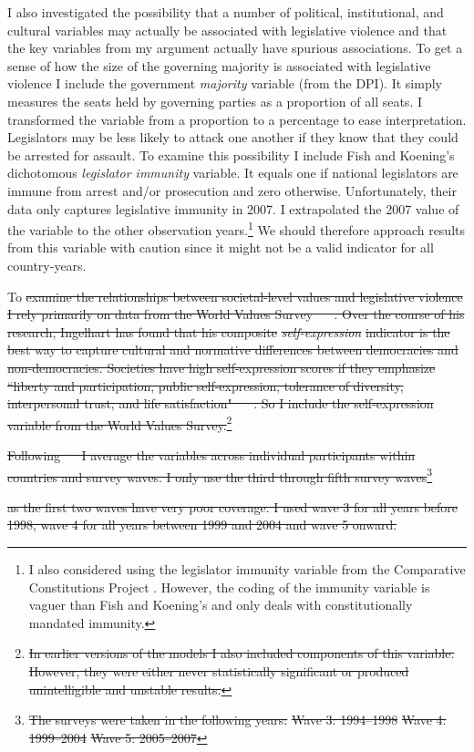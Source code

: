 \documentclass[a4paper]{article}\usepackage[]{graphicx}\usepackage[]{color}
\providecommand{\DIFdeltex}[1]{{\protect\color{red}\sout{#1}}}                      %
\providecommand{\DIFdelbegin}{} %
\providecommand{\DIFdel}[1]{\texorpdfstring{\DIFdeltex{#1}}{}} %
\begin{document}
I also investigated the possibility that a number of political, institutional, and cultural variables may actually be associated with legislative violence and that the key variables from my argument actually have spurious associations. To get a sense of how the size of the governing majority is associated with legislative violence I include the government {\emph{majority}} variable (from the DPI). It simply measures the seats held by governing parties as a proportion of all seats. I transformed the variable from a proportion to a percentage to ease interpretation. Legislators may be less likely to attack one another if they know that they could be arrested for assault. To examine this possibility I include Fish and Koening's \citeyearpar{Fish2009} dichotomous \emph{legislator immunity} variable. It equals one if national legislators are immune from arrest and/or prosecution and zero otherwise. Unfortunately, their data only captures legislative immunity in 2007. I extrapolated the 2007 value of the variable to the other observation years.\footnote{I also considered using the legislator immunity variable from the Comparative Constitutions Project \citep{ElkinsCCP2010}. However, the coding of the immunity variable is vaguer than Fish and Koening's and only deals with constitutionally mandated immunity.} We should therefore approach results from this variable with caution since it might not be a valid indicator for all country-years.

To \DIFdelbegin \DIFdel{examine the relationships between societal-level values and legislative violence I rely primarily on data from the World Values Survey \mbox{%
\citeyearpar{WVS2009}
}%
. Over the course of his research, Ingelhart has found that his composite }%
\emph{\DIFdel{self-expression}}%
\DIFdel{indicator is the best way to capture cultural and normative differences between democracies and non-democracies. Societies have high self-expression scores if they emphasize ``liberty and participation, public self-expression, tolerance of diversity, interpersonal trust, and life satisfaction" \mbox{%
\citep[64]{Inglehart2003}
}%
. So I include the self-expression variable from the World Values Survey.}\footnote{\DIFdel{In earlier versions of the models I also included components of this variable. However, they were either never statistically significant or produced unintelligible and unstable results.}} %
\addtocounter{footnote}{-1}%
\DIFdel{Following \mbox{%
\cite{Inglehart2003}
}%
I average the variables across individual participants within countries and survey waves. I only use the third through fifth survey waves}\footnote{\DIFdel{The surveys were taken in the following years: }%
\DIFdel{Wave 3: 1994--1998 }%
\DIFdel{Wave 4: 1999--2004 }%
\DIFdel{Wave 5: 2005--2007}} %
\addtocounter{footnote}{-1}%
\DIFdel{as the first two waves have very poor coverage. I used wave 3 for all years before 1998, wave 4 for all years between 1999 and 2004 and wave 5 onward.
}%
\end{document}
